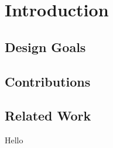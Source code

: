 \section{Introduction}

\subsection{Design Goals}
\subsection{Contributions}
\subsection{Related Work}
 Hello